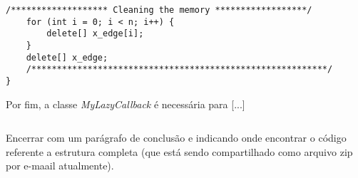 \begin{lstlisting}[style=cplusplusListStyle, caption= Código referente à  classe \emph{MyCutCallback}, label=cod:cutCallback]
	/******************* Cleaning the memory ******************/
	for (int i = 0; i < n; i++) {
		delete[] x_edge[i];
	}
	delete[] x_edge;
	/**********************************************************/
}

\end{lstlisting}

Por fim, a classe \emph{MyLazyCallback} é necessária para {\color{red}[...]}

\begin{lstlisting}[style=cplusplusListStyle, caption= Código referente à  classe \emph{MyLazyCallback}, label=cod:lazyCallback]

\end{lstlisting}

{\color{red}Encerrar com um parágrafo de conclusão e indicando onde encontrar o código referente a estrutura completa (que está sendo compartilhado como arquivo zip por e-maail atualmente).}




